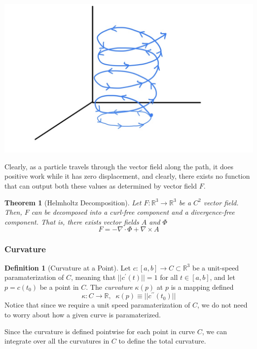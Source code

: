 \documentclass{article}
\newtheorem{theorem}{Theorem}[section]
\theoremstyle{remark}
\theoremstyle{definition}
\newtheorem{definition}{Definition}[section]
\begin{document}
\begin{center}
    \includegraphics[scale=0.28]{img/Solenoid_nonconservative.jpg}
\end{center}
Clearly, as a particle travels through the vector field along the path, it does positive work while it has zero displacement, and clearly, there exists no function that can output both these values as determined by vector field $F$. 

\begin{theorem}[Helmholtz Decomposition]
Let $F: \mathbb{R}^3 \longrightarrow \mathbb{R}^3$ be a $C^2$ vector field. Then, $F$ can be decomposed into a curl-free component and a divergence-free component. That is, there exists vector fields $A$ and $\Phi$
\[F = - \nabla \cdot \Phi + \nabla \times A\]
\end{theorem}

\subsubsection{Curvature}
\begin{definition}[Curvature at a Point]
Let $c: [a, b] \longrightarrow C \subset \mathbb{R}^3$ be a unit-speed paramaterization of $C$, meaning that $||c^\prime (t)|| = 1$ for all $t \in [a,b]$, and let $p = c(t_0)$ be a point in $C$. The \textit{curvature} $\kappa(p)$ at $p$ is a mapping defined
\[\kappa: C \longrightarrow \mathbb{R}, \;\; \kappa(p) \equiv ||c^{\prime \prime} (t_0)||\]
Notice that since we require a unit speed paramaterization of $C$, we do not need to worry about how a given curve is paramaterized. 
\end{definition}

Since the curvature is defined pointwise for each point in curve $C$, we can integrate over all the curvatures in $C$ to define the total curvature. 
\end{document}
